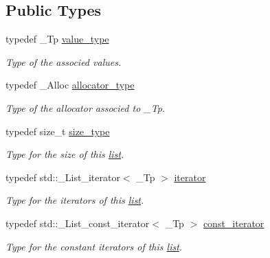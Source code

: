 \subsection*{Public Types}
\begin{DoxyCompactItemize}
\item 
\mbox{\label{classutils_1_1PointerList_af1c536b3d0d508b69700ad038ea5279a}} 
typedef \+\_\+\+Tp \hyperlink{classutils_1_1PointerList_af1c536b3d0d508b69700ad038ea5279a}{value\+\_\+type}
\begin{DoxyCompactList}\small\item\em Type of the associed values. \end{DoxyCompactList}\item 
\mbox{\label{classutils_1_1PointerList_a3b41bb503c3d41a7120b1a9cd1ba9848}} 
typedef \+\_\+\+Alloc \hyperlink{classutils_1_1PointerList_a3b41bb503c3d41a7120b1a9cd1ba9848}{allocator\+\_\+type}
\begin{DoxyCompactList}\small\item\em Type of the allocator associed to \+\_\+\+Tp. \end{DoxyCompactList}\item 
typedef size\+\_\+t \hyperlink{classutils_1_1PointerList_a8d7b485e236a01cc14b41694ae0b3456}{size\+\_\+type}
\begin{DoxyCompactList}\small\item\em Type for the size of this \hyperlink{protocollist-p}{list}. \end{DoxyCompactList}\item 
\mbox{\label{classutils_1_1PointerList_a05f57884241fe77050d177e9615501e3}} 
typedef std\+::\+\_\+\+List\+\_\+iterator$<$ \+\_\+\+Tp $>$ \hyperlink{classutils_1_1PointerList_a05f57884241fe77050d177e9615501e3}{iterator}
\begin{DoxyCompactList}\small\item\em Type for the iterators of this \hyperlink{protocollist-p}{list}. \end{DoxyCompactList}\item 
\mbox{\label{classutils_1_1PointerList_aec91f3c1085620fe3beaff9ecee67293}} 
typedef std\+::\+\_\+\+List\+\_\+const\+\_\+iterator$<$ \+\_\+\+Tp $>$ \hyperlink{classutils_1_1PointerList_aec91f3c1085620fe3beaff9ecee67293}{const\+\_\+iterator}
\begin{DoxyCompactList}\small\item\em Type for the constant iterators of this \hyperlink{protocollist-p}{list}. \end{DoxyCompactList}\end{DoxyCompactItemize}
